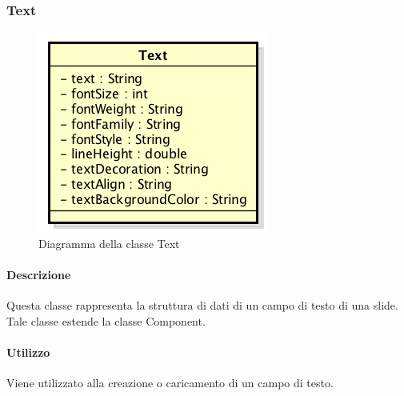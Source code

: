 \newpage


\subsubsection{Text}

	\begin{figure}[h]
		\centering
		\includegraphics[width=0.4\linewidth]{img/premi_front_end_model_text}
		\caption[Diagramma della classe Text]{Diagramma della classe Text}
		\label{fig:back_end_premi_model_text}
	\end{figure}

	\paragraph{Descrizione}
	Questa classe rappresenta la struttura di dati di un campo di testo di una \gls{slide}. Tale classe estende la classe Component.
	
	\paragraph{Utilizzo}
	Viene utilizzato alla creazione o caricamento di un campo di testo.
	
